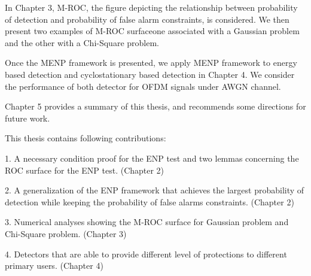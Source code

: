 In Chapter 3, M-ROC, the figure depicting the relationship between probability of detection and probability of false alarm constraints, is considered.  We then present two examples of M-ROC surfaceone associated with a Gaussian problem and the other with a Chi-Square problem. 

Once the MENP framework is presented, we apply MENP framework to energy based detection and cyclostationary based detection in Chapter 4. We consider  the performance of both detector for OFDM signals under AWGN channel. 

Chapter 5 provides a summary of this thesis, and recommends some directions for future work.  

This thesis contains following contributions:

1. A necessary condition proof for the ENP test and two lemmas concerning the ROC surface for the ENP test. (Chapter 2) 

2. A generalization of the ENP framework that achieves the largest probability of detection while keeping the probability of false alarms constraints. (Chapter 2) 

3. Numerical analyses showing the M-ROC surface for Gaussian problem and Chi-Square problem. (Chapter 3)

4. Detectors that are able to provide different level of protections to different primary users. (Chapter 4) 
